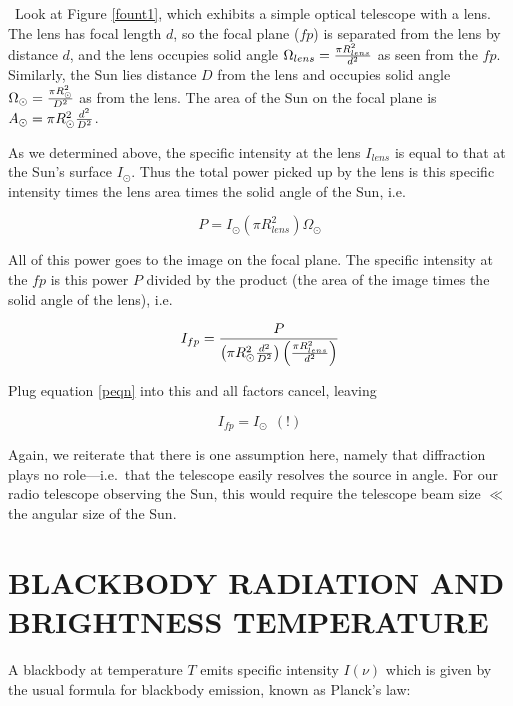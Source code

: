 \documentclass[psfig,preprint]{aastex}
\begin{document}
\	Look at Figure \ref{fount1}, which exhibits a simple optical
telescope  with a lens. The lens has focal length $d$, so the focal
plane ($fp$) is separated from the lens by distance $d$, and the lens
occupies  solid angle $\Omega_{lens} = {\pi R_{lens}^2 \over d^2}$ as
seen from the $fp$. Similarly, the Sun lies distance $D$ from the lens
and occupies solid angle $\Omega_\odot = {\pi R_\odot^2 \over D^2}$ as
from the lens. The area of the Sun on the focal plane is $A_\odot = \pi
R_\odot^2  {d^2 \over D^2} $.

	As we determined above, the specific intensity at the lens
$I_{lens}$ is equal to that at the Sun's surface $I_\odot$. Thus the
total power picked up by the lens is this specific intensity times the
lens area times the solid angle of the Sun, i.e.

\begin{equation} \label{peqn}
P = I_\odot (\pi R_{lens}^2) \Omega_\odot
\end{equation}

\noindent All of this power goes to the image on the focal plane. The
specific intensity at the $fp$ is this power $P$ divided by the product
(the area of the image times the solid angle of the lens), i.e.

\begin{equation}
I_{fp} = { P \over \left( \pi R_\odot^2 {d^2 \over D^2} \right) 
\left( {\pi R_{lens}^2 \over d^2} \right) } 
\end{equation}

\noindent Plug equation \ref{peqn} into this and all factors cancel,
leaving

\begin{equation}
I_{fp} = I_\odot \ \ (!)
\end{equation}

	Again, we reiterate that there is one assumption here, namely
that diffraction plays no role---i.e.\ that the telescope easily
resolves the source in angle.  For our radio telescope observing the
Sun, this would require the telescope beam size $\ll$ the angular size
of the Sun.

\section {BLACKBODY RADIATION AND BRIGHTNESS TEMPERATURE}

	A blackbody at temperature $T$ emits specific intensity $I(\nu)$
which is given by the usual formula for blackbody emission, known as
Planck's law:
\end{document}
